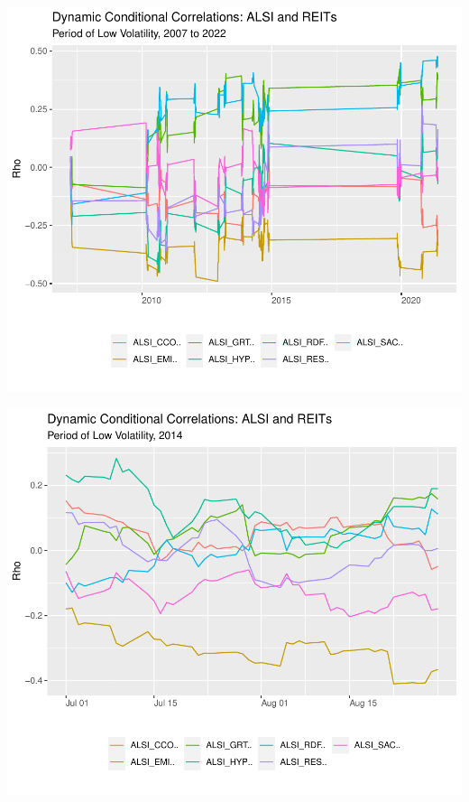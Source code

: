 \documentclass[11pt,preprint, authoryear]{elsarticle}
\let\origfigure\figure
\let\endorigfigure\endfigure
\renewenvironment{figure}[1][2] {
    \expandafter\origfigure\expandafter[H]
} {
    \endorigfigure
}
\numberwithin{equation}{section}
\numberwithin{figure}{section}
\numberwithin{table}{section}
\begin{document}
\begin{figure}
\centering
\includegraphics{Fin_Metrics_Project_files/figure-latex/unnamed-chunk-10-1.pdf}
\caption{Dynamic Conditional Correlations Graph}
\end{figure}

\begin{figure}
\centering
\includegraphics{Fin_Metrics_Project_files/figure-latex/unnamed-chunk-12-1.pdf}
\caption{Dynamic Conditional Correlations Graph}
\end{figure}
\end{document}

